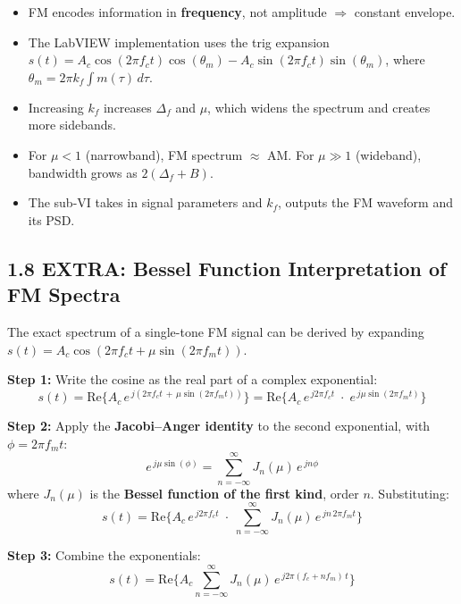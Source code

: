 \documentclass[../../main.tex]{subfiles}
\begin{document}
\vspace{1.5em}

\begin{SummaryBox}
\begin{itemize}[leftmargin=1.5em]
  \item FM encodes information in \textbf{frequency}, not amplitude $\Rightarrow$ constant envelope.
  \item The LabVIEW implementation uses the trig expansion $s(t) = A_c\cos(2\pi f_c t)\cos(\theta_m) - A_c\sin(2\pi f_c t)\sin(\theta_m)$, where $\theta_m = 2\pi k_f \int m(\tau)\,d\tau$.
  \item Increasing $k_f$ increases $\Delta_f$ and $\mu$, which widens the spectrum and creates more sidebands.
  \item For $\mu < 1$ (narrowband), FM spectrum $\approx$ AM. For $\mu \gg 1$ (wideband), bandwidth grows as $2(\Delta_f + B)$.
  \item The sub-VI takes in signal parameters and $k_f$, outputs the FM waveform and its PSD.
\end{itemize}
\end{SummaryBox}

\newpage

\subsection{1.8 \; EXTRA: Bessel Function Interpretation of FM Spectra}

The exact spectrum of a single-tone FM signal can be derived by expanding $s(t) = A_c \cos(2\pi f_c t + \mu\sin(2\pi f_m t))$.

\textbf{Step 1:} Write the cosine as the real part of a complex exponential:
\[
  s(t) = \text{Re}\Big\{A_c\, e^{\,j(2\pi f_c t \,+\, \mu\sin(2\pi f_m t))}\Big\}
  = \text{Re}\Big\{A_c\, e^{\,j2\pi f_c t} \;\cdot\; e^{\,j\mu\sin(2\pi f_m t)}\Big\}
\]

\textbf{Step 2:} Apply the \textbf{Jacobi--Anger identity} to the second exponential, with $\phi = 2\pi f_m t$:
\[
  e^{\,j\mu\sin(\phi)} = \sum_{n=-\infty}^{\infty} J_n(\mu)\,e^{\,jn\phi}
\]
where $J_n(\mu)$ is the \textbf{Bessel function of the first kind}, order $n$. Substituting:
\[
  s(t) = \text{Re}\bigg\{A_c\, e^{\,j2\pi f_c t} \;\cdot\; \sum_{n=-\infty}^{\infty} J_n(\mu)\,e^{\,jn\,2\pi f_m t}\bigg\}
\]

\textbf{Step 3:} Combine the exponentials:
\[
  s(t) = \text{Re}\bigg\{A_c \sum_{n=-\infty}^{\infty} J_n(\mu)\,e^{\,j2\pi(f_c + n f_m)\,t}\bigg\}
\]
\end{document}

